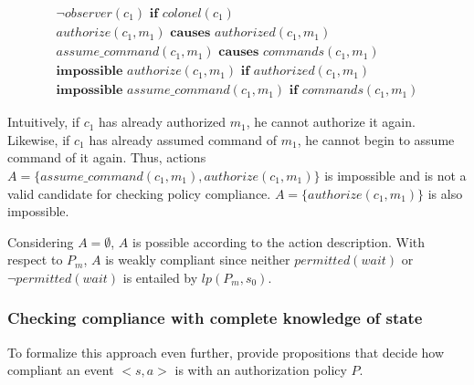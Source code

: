 \begin{gather}
    \neg observer(c_1) \textbf{ if } colonel(c_1) \label{eq:apl_action_description_5} \\
    authorize(c_1, m_1) \textbf{ causes } authorized(c_1, m_1) \label{eq:apl_action_description_1} \\
    assume\_command(c_1, m_1) \textbf{ causes } commands(c_1, m_1) \label{eq:apl_action_description_2} \\
    \textbf{impossible } authorize(c_1, m_1) \textbf{ if } authorized(c_1, m_1) \label{eq:apl_action_description_3} \\
    \textbf{impossible } assume\_command(c_1, m_1) \textbf{ if } commands(c_1, m_1) \label{eq:apl_action_description_4}
\end{gather}

Intuitively, if $c_1$ has already authorized $m_1$, he cannot authorize it again.
Likewise, if $c_1$ has already assumed command of $m_1$, he cannot begin to assume command of it again.
Thus, actions $A = \{assume\_command(c_1, m_1), authorize(c_1, m_1)\}$ is impossible and is not a valid candidate for checking policy compliance.
$A = \{authorize(c_1, m_1)\}$ is also impossible.

Considering $A=\emptyset$, $A$ is possible according to the action description.
With respect to $P_m$, $A$ is weakly compliant since neither $permitted(wait)$ or $\neg permitted(wait)$ is entailed by $lp(P_m, s_0)$.

\subsubsection{Checking compliance with complete knowledge of state}

To formalize this approach even further, \citet{gelfond_authorization_2008} provide propositions that decide how compliant an event $<s,a>$ is with an authorization policy $P$.

